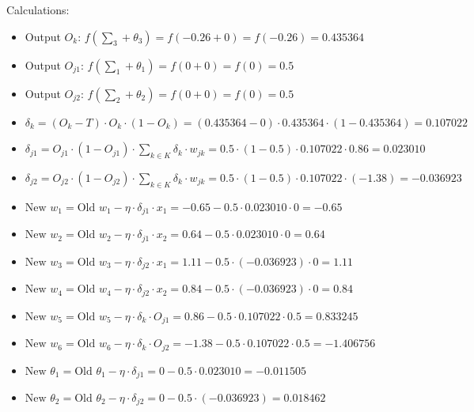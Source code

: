 \documentclass{book}
\begin{document}
Calculations:\\
\begin{itemize}
    \item Output \(O_{k}\): \(f(\sum_3 + \theta_3) = f(-0.26 + 0) = f(-0.26) = 0.435364\)
    \item Output \(O_{j1}\): \(f(\sum_1 + \theta_1) = f(0 + 0) = f(0) = 0.5\)
    \item Output \(O_{j2}\): \(f(\sum_2 + \theta_2) = f(0 + 0) = f(0) = 0.5\)
    \item \(\delta_k = (O_k - T) \cdot O_k \cdot (1 - O_k) = (0.435364 - 0) \cdot 0.435364 \cdot (1 - 0.435364) = 0.107022\)
    \item \(\delta_{j1} = O_{j1} \cdot (1 - O_{j1}) \cdot \sum_{k \in K} \delta_k \cdot w_{jk} = 0.5 \cdot (1 - 0.5) \cdot 0.107022 \cdot 0.86 = 0.023010\)
    \item \(\delta_{j2} = O_{j2} \cdot (1 - O_{j2}) \cdot \sum_{k \in K} \delta_k \cdot w_{jk} = 0.5 \cdot (1 - 0.5) \cdot 0.107022 \cdot (-1.38) = -0.036923\)
    \item \(\text{New } w_1 = \text{Old } w_1 - \eta \cdot \delta_{j1} \cdot x_1 = -0.65 - 0.5 \cdot 0.023010 \cdot 0 = -0.65\)
    \item \(\text{New } w_2 = \text{Old } w_2 - \eta \cdot \delta_{j1} \cdot x_2 = 0.64 - 0.5 \cdot 0.023010 \cdot 0 = 0.64\)
    \item \(\text{New } w_3 = \text{Old } w_3 - \eta \cdot \delta_{j2} \cdot x_1 = 1.11 - 0.5 \cdot (-0.036923) \cdot 0 = 1.11\)
    \item \(\text{New } w_4 = \text{Old } w_4 - \eta \cdot \delta_{j2} \cdot x_2 = 0.84 - 0.5 \cdot (-0.036923) \cdot 0 = 0.84\)
    \item \(\text{New } w_5 = \text{Old } w_5 - \eta \cdot \delta_k \cdot O_{j1} = 0.86 - 0.5 \cdot 0.107022 \cdot 0.5 = 0.833245\)
    \item \(\text{New } w_6 = \text{Old } w_6 - \eta \cdot \delta_k \cdot O_{j2} = -1.38 - 0.5 \cdot 0.107022 \cdot 0.5 = -1.406756\)
    \item \(\text{New } \theta_1 = \text{Old } \theta_1 - \eta \cdot \delta_{j1} = 0 - 0.5 \cdot 0.023010 = -0.011505\)
    \item \(\text{New } \theta_2 = \text{Old } \theta_2 - \eta \cdot \delta_{j2} = 0 - 0.5 \cdot (-0.036923) = 0.018462\)
\end{itemize}
\\
\end{document}
